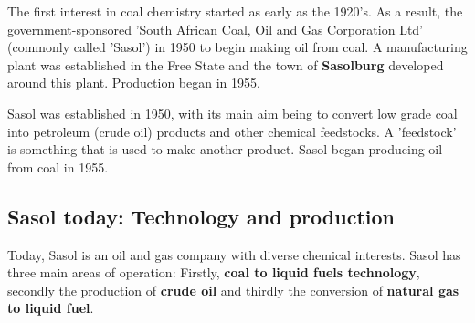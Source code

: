 \begin{IFact}{%
  The first interest in coal chemistry started as early as the 1920's.
  As a result, the government-sponsored 'South African Coal, Oil and
  Gas Corporation Ltd' (commonly called 'Sasol') in 1950 to begin
  making oil from coal. A manufacturing plant was established in the
  Free State and the town of \textbf{Sasolburg} developed around this
  plant. Production began in 1955.
}
\end{IFact}

Sasol was established in 1950, with its main aim being to convert low grade coal into petroleum (crude oil) products and other chemical feedstocks. A 'feedstock' is something that is used to make another product. Sasol began producing oil from coal in 1955.

\subsection{Sasol today: Technology and production}
\label{subsec:chem:technology}

Today, Sasol is an oil and gas company with diverse chemical interests. Sasol has three main areas of operation: Firstly, \textbf{coal to liquid fuels technology}, secondly the production of \textbf{crude oil} and thirdly the conversion of \textbf{natural gas to liquid fuel}.

